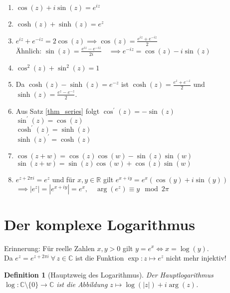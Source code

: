 \documentclass[a4paper,12pt]{book}
\theoremstyle{newthm}
\theoremstyle{newdef}
\newtheorem{defn}[thm]{Definition}
\theoremstyle{newrem}
\newcommand{\R}{\mathbb{R}}
\newcommand{\C}{\mathbb{C}}
\begin{document}
		\begin{enumerate}[label={\alph*})]
			\item $ \cos(z) + i\sin(z) = e^{iz} $
			\item $ \cosh(z) + \sinh(z) = e^z $
			\item $ e^{iz} + e^{-iz} = 2 \cos(z) \implies \cos(z) = \frac{e^{iz} + e^{-iz}}{2} $\\
			Ähnlich: $ \sin(z) = \frac{e^{iz} - e^{-iz}}{2i} \quad \implies e^{-iz} = \cos(z) -i\sin(z) $
			\item $ \cos^2(z) + \sin^2(z) = 1 $
			\item Da $ \cosh(z) - \sinh(z) = e^{-z} $ ist $ \cosh(z) = \frac{e^{z} + e^{-z}}{2} $ und $ \sinh(z) = \frac{e^{z} - e^{-z}}{2} $.
			\item Aus Satz \ref{thm_series} folgt $ \cos^\prime(z) = -\sin(z) $\\
			$ \sin^\prime(z) = \cos(z) $\\
			$ \cosh^\prime(z) = \sinh(z) $\\
			$ \sinh(z)^\prime = \cosh(z) $
			\item $ \cos(z+w) = \cos(z)\cos(w) - \sin(z)\sin(w) $\\
			$ \sin(z+w) = \sin(z)\cos(w) + \cos(z)\sin(w) $
			\item $ e^{z+2\pi i} = e^z $ und für $ x,y \in \R $ gilt $ e^{x+iy} = e^x(\cos(y)+i\sin(y)) $\\
			$ \implies |e^z| = |e^{x+iy}| = e^x, \quad \arg(e^z) \equiv y \mod 2\pi $
		\end{enumerate}
	
	
	
	\section{Der komplexe Logarithmus}
		
		Erinnerung: Für reelle Zahlen $ x,y > 0 $ gilt $ y = e^x \iff x = \log(y) $.\\
		Da $ e^z = e^{z+2\pi i} \ \forall\, z \in \C $ ist die Funktion $ \exp: z \mapsto e^z $ nicht mehr injektiv!
		
		\begin{defn}[Hauptzweig des Logarithmus]
			Der \emph{Hauptlogarithmus} $ \log: \C \setminus \{0\} \to \C $ ist die Abbildung $ z \mapsto \log(|z|) + i \arg(z) $.
		\end{defn}
		
\end{document}
